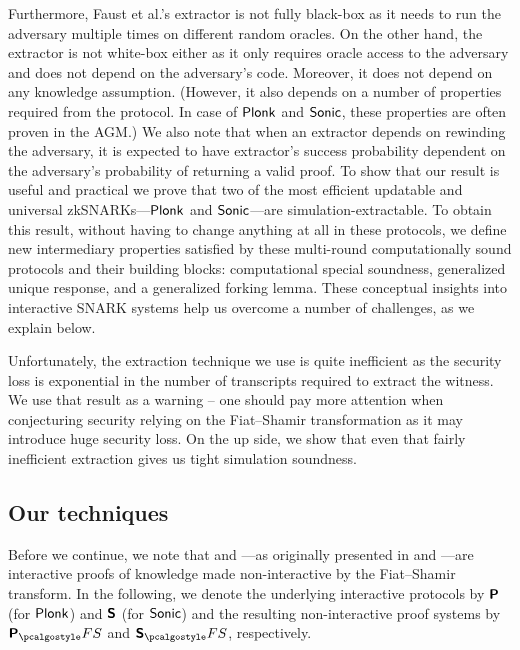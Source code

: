 \documentclass[runningheads,11pt]{llncs}
\begin{document}
Furthermore, Faust et al.'s extractor is not fully black-box as it needs to run
the adversary multiple times on different random oracles. On the other hand, the
extractor is not white-box either as it only requires oracle access to the
adversary and does not depend on the adversary's code. Moreover, it does not
depend on any knowledge assumption.  (However, it also depends on a number of
properties required from the protocol. In case of $\textnormal{\textsf{Plonk}}$ and ${\textnormal{\textsf{Sonic}}}$, these
properties are often proven in the AGM.) We also note that when an extractor
depends on rewinding the adversary, it is expected to have extractor's success
probability dependent on the adversary's probability of returning a valid proof.
To show that our result is useful and practical we prove that two of the most
efficient updatable and universal zkSNARKs---$\textnormal{\textsf{Plonk}}$ and ${\textnormal{\textsf{Sonic}}}$---are
simulation-extractable. To obtain this result, without having to change anything
at all in these protocols, we define new intermediary properties satisfied by
these multi-round computationally sound protocols and their building blocks:
computational special soundness, generalized unique response, and a generalized
forking lemma. These conceptual insights into interactive SNARK systems help us
overcome a number of challenges, as we explain below.

Unfortunately, the extraction technique we use is quite inefficient as the
security loss is exponential in the number of transcripts required to extract
the witness. We use that result as a warning -- one should pay more attention
when conjecturing security relying on the Fiat--Shamir transformation as it may
introduce huge security loss.  On the up side, we show that even that fairly
inefficient extraction gives us tight simulation soundness.

\subsection{Our techniques}

Before we continue, we note that \plonk{} and \sonic{}---as originally presented
in \cite{EPRINT:GabWilCio19} and \cite{CCS:MBKM19}---are interactive proofs of
knowledge made non-interactive by the Fiat--Shamir transform. In the following,
we denote the underlying interactive protocols by $\bm{\mathsf{P}}$ (for $\textnormal{\textsf{Plonk}}$)
and $\bm{\mathsf{S}}$ (for ${\textnormal{\textsf{Sonic}}}$) and the resulting non-interactive proof systems by
$\plonkprotfs$ and $\sonicprotfs$, respectively.
\end{document}
